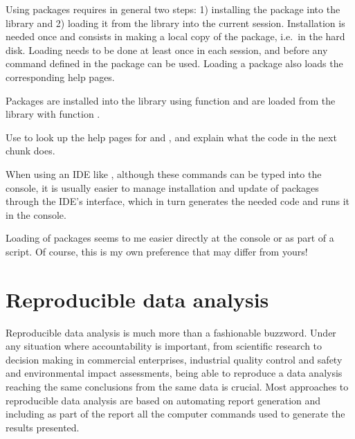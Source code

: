 \documentclass[krantz2]{krantz}\usepackage{knitr}%
\begin{document}
Using packages requires in general two steps: 1) installing the package into the \Rpgrm library and 2) loading it from the library into the current \Rpgrm session. Installation is needed once and consists in making a local copy of the package, i.e.\ in the hard disk. Loading needs to be done at least once in each \Rpgrm session, and before any command defined in the package can be used. Loading a package also loads the corresponding help pages.

Packages are installed into the library using function  and are loaded from the library with function .

\begin{playground}
  Use  to look up the help pages for  and , and explain what the code in the next chunk does.
\begin{knitrout}\footnotesize
{}\color{fgcolor}\begin{kframe}
\begin{alltt}
\end{alltt}
\end{kframe}
\end{knitrout}
\end{playground}

When using an IDE like \RStudio, although these commands can be typed into the \Rpgrm console, it is usually easier to manage installation and update of packages through the IDE's interface, which in turn generates the needed \Rlang code and runs it in the console.

Loading of packages seems to me easier directly at the console or as part of a script. Of course, this is my own preference that may differ from yours!

\section{Reproducible data analysis}
Reproducible data analysis is much more than a fashionable buzzword. Under any situation where accountability is important, from scientific research to decision making in commercial enterprises, industrial quality control and safety and environmental impact assessments, being able to reproduce a data analysis reaching the same conclusions from the same data is crucial. Most approaches to reproducible data analysis are based on automating report generation and including as part of the report all the computer commands used to generate the results presented.
\end{document}
